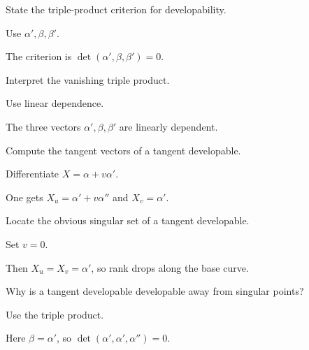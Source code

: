 \begin{exercise}\label{exr:vii18-13}
State the triple-product criterion for developability.
\end{exercise}
\begin{hint}
Use \(\alpha',\beta,\beta'\).
\end{hint}
\begin{solution}
The criterion is \(\det(\alpha',\beta,\beta')=0\).
\end{solution}

\begin{exercise}\label{exr:vii18-14}
Interpret the vanishing triple product.
\end{exercise}
\begin{hint}
Use linear dependence.
\end{hint}
\begin{solution}
The three vectors \(\alpha',\beta,\beta'\) are linearly dependent.
\end{solution}

\begin{exercise}\label{exr:vii18-15}
Compute the tangent vectors of a tangent developable.
\end{exercise}
\begin{hint}
Differentiate \(X=\alpha+v\alpha'\).
\end{hint}
\begin{solution}
One gets \(X_u=\alpha'+v\alpha''\) and \(X_v=\alpha'\).
\end{solution}

\begin{exercise}\label{exr:vii18-16}
Locate the obvious singular set of a tangent developable.
\end{exercise}
\begin{hint}
Set \(v=0\).
\end{hint}
\begin{solution}
Then \(X_u=X_v=\alpha'\), so rank drops along the base curve.
\end{solution}

\begin{exercise}\label{exr:vii18-17}
Why is a tangent developable developable away from singular points?
\end{exercise}
\begin{hint}
Use the triple product.
\end{hint}
\begin{solution}
Here \(\beta=\alpha'\), so \(\det(\alpha',\alpha',\alpha'')=0\).
\end{solution}

